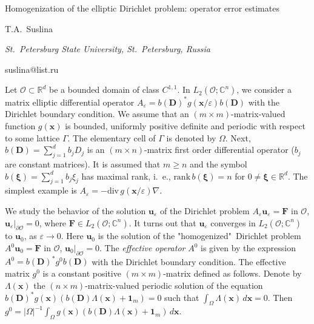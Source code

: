 \documentclass[10pt,a4paper]{article}
\begin{document}
\begin{center}

{\Large Homogenization of the elliptic Dirichlet problem: operator error estimates}

\bigskip

{\sc T.A.~Suslina}

{\small\it St.~Petersburg State University, St.~Petersburg, Russia}

{\small\rm suslina@list.ru}

\end{center}

\bigskip

Let $\mathcal{O} \subset \mathbb{R}^d$ be a bounded domain of class $C^{1,1}$.
In $L_2(\mathcal{O};\mathbb{C}^n)$, we consider a matrix elliptic differential
operator $A_{\varepsilon}= b(\mathbf{D})^* g(\mathbf{x}/\varepsilon) b(\mathbf{D})$
with the Dirichlet boundary condition. We assume that
an $(m\times m)$-matrix-valued function $g(\mathbf{x})$
is bounded, uniformly positive definite and periodic
with respect to some lattice $\Gamma$. The elementary cell of $\Gamma$ is denoted by $\Omega$.
Next, $b(\mathbf{D})=\sum_{j=1}^d b_j D_j$ is an $(m\times n)$-matrix first
order differential operator ($b_j$ are constant
matrices). It is assumed that $m \ge n$ and the symbol $b(\boldsymbol{\xi})= \sum_{j=1}^d b_j \xi_j$
has maximal rank, i.~e., $\text{rank}\,b(\boldsymbol{\xi})= n$ for $0 \ne \boldsymbol{\xi} \in
\mathbb{R}^d$. The simplest example is $A_{\varepsilon} = -\text{div}\,g(\mathbf{x}/\varepsilon)\nabla$.

We study the behavior of the solution $\mathbf{u}_\varepsilon$ of the Dirichlet problem
$A_{\varepsilon}\mathbf{u}_\varepsilon = \mathbf{F}$ in $\mathcal{O}$,
$\mathbf{u}_\varepsilon\vert_{\partial \mathcal{O}} =0$,
where $\mathbf{F} \in L_2(\mathcal{O};\mathbb{C}^n)$.
It turns out that $\mathbf{u}_\varepsilon$ converges in $L_2(\mathcal{O};\mathbb{C}^n)$
to $\mathbf{u}_0$, as $\varepsilon \to 0$. Here $\mathbf{u}_0$ is the solution of the "homogenized"\
Dirichlet problem $A^0 \mathbf{u}_0=\mathbf{F}$ in $\mathcal{O}$,
$\mathbf{u}_0\vert_{\partial \mathcal{O}} =0$. The \textit{effective operator}
$A^0$ is given by the expression $A^0 = b(\mathbf{D})^* g^0 b(\mathbf{D})$
with the Dirichlet boundary condition. The effective matrix $g^0$ is a constant positive $(m\times m)$-matrix
defined as follows. Denote by $\Lambda(\mathbf{x})$ the $(n \times m)$-matrix-valued
periodic solution of the equation
$b(\mathbf{D})^* g(\mathbf{x}) (b(\mathbf{D})\Lambda(\mathbf{x}) + \mathbf{1}_m) =0$
such that $\int_\Omega \Lambda(\mathbf{x})\, d\mathbf{x} =0$.
Then $g^0 = |\Omega|^{-1} \int_\Omega g(\mathbf{x}) (b(\mathbf{D})\Lambda(\mathbf{x})
+ \mathbf{1}_m)\,d\mathbf{x}$.
\end{document}
